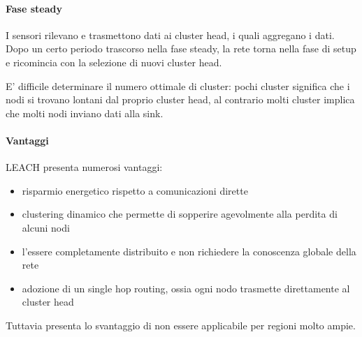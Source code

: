 \paragraph{Fase steady}
	I sensori rilevano e trasmettono dati ai cluster head, i quali aggregano i dati. Dopo un certo periodo trascorso nella fase steady, la rete torna nella fase di setup e ricomincia con la selezione di nuovi cluster head.
	
	E' difficile determinare il numero ottimale di cluster: pochi cluster significa che i nodi si trovano lontani dal proprio cluster head, al contrario molti cluster implica che molti nodi inviano dati alla sink.
	
\paragraph{Vantaggi}
	LEACH presenta numerosi vantaggi: 
	\begin{itemize}
		\item risparmio energetico rispetto a comunicazioni dirette
		\item clustering dinamico che permette di sopperire agevolmente alla perdita di alcuni nodi
		\item l'essere completamente distribuito e non richiedere la conoscenza globale della rete
		\item adozione di un single hop routing, ossia ogni nodo trasmette direttamente al cluster head
	\end{itemize}
	Tuttavia presenta lo svantaggio di non essere applicabile per regioni molto ampie.
		
	
	
	
